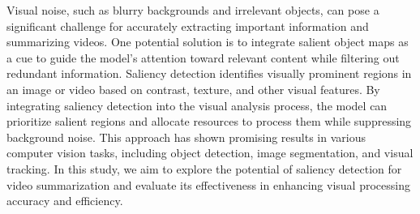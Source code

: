 \documentclass[14pt]{extarticle}
\begin{document}
    Visual noise, such as blurry backgrounds and irrelevant objects, can pose a significant challenge for accurately extracting important information and summarizing videos. One potential solution is to integrate salient object maps as a cue to guide the model's attention toward relevant content while filtering out redundant information. Saliency detection identifies visually prominent regions in an image or video based on contrast, texture, and other visual features. By integrating saliency detection into the visual analysis process, the model can prioritize salient regions and allocate resources to process them while suppressing background noise. This approach has shown promising results in various computer vision tasks, including object detection, image segmentation, and visual tracking. In this study, we aim to explore the potential of saliency detection for video summarization and evaluate its effectiveness in enhancing visual processing accuracy and efficiency.
    
\end{document}
